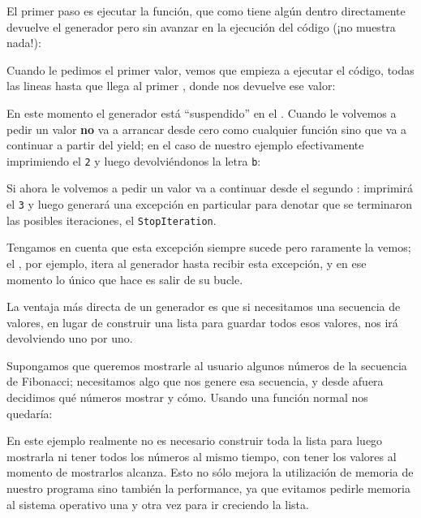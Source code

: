 El primer paso es ejecutar la función, que como tiene algún  dentro directamente devuelve el generador pero sin avanzar en la ejecución del código (¡no muestra nada!):


Cuando le pedimos el primer valor, vemos que empieza a ejecutar el código, todas las lineas hasta que llega al primer , donde nos devuelve ese valor:


En este momento el generador está ``suspendido'' en el . Cuando le volvemos a pedir un valor \textbf{no} va a arrancar desde cero como cualquier función sino que va a continuar a partir del yield; en el caso de nuestro ejemplo efectivamente imprimiendo el \texttt{2} y luego devolviéndonos la letra \texttt{b}:


Si ahora le volvemos a pedir un valor va a continuar desde el segundo : imprimirá el \texttt{3} y luego generará una excepción en particular para denotar que se terminaron las posibles iteraciones, el \texttt{StopIteration}.


Tengamos en cuenta que esta excepción siempre sucede pero raramente la vemos; el , por ejemplo, itera al generador hasta recibir esta excepción, y en ese momento lo único que hace es salir de su bucle.

La ventaja más directa de un generador es que si necesitamos una secuencia de valores, en lugar de construir una lista para guardar todos esos valores, nos irá devolviendo uno por uno. 

Supongamos que queremos mostrarle al usuario algunos números de la secuencia de Fibonacci; necesitamos algo que nos genere esa secuencia, y desde afuera decidimos qué números mostrar y cómo. Usando una función normal nos quedaría:


En este ejemplo realmente no es necesario construir toda la lista para luego mostrarla ni tener todos los números al mismo tiempo, con tener los valores al momento de mostrarlos alcanza. Esto no sólo mejora la utilización de memoria de nuestro programa sino también la performance, ya que evitamos pedirle memoria al sistema operativo una y otra vez para ir creciendo la lista.


